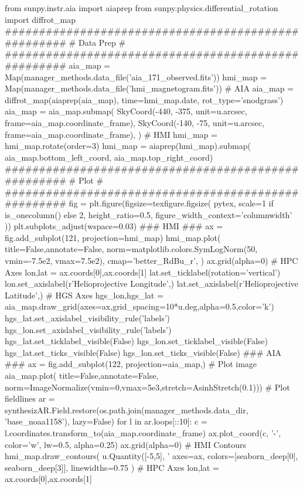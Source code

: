 \begin{pycode}
from sunpy.instr.aia import aiaprep
from sunpy.physics.differential_rotation import diffrot_map
####################################################
#                     Data Prep                    #
####################################################
aia_map = Map(manager_methods.data_file('aia_171_observed.fits'))
hmi_map = Map(manager_methods.data_file('hmi_magnetogram.fits'))
# AIA
aia_map = diffrot_map(aiaprep(aia_map), time=hmi_map.date, rot_type='snodgrass')
aia_map = aia_map.submap(
    SkyCoord(-440, -375, unit=u.arcsec, frame=aia_map.coordinate_frame),
    SkyCoord(-140, -75, unit=u.arcsec, frame=aia_map.coordinate_frame),
)
# HMI
hmi_map = hmi_map.rotate(order=3)
hmi_map = aiaprep(hmi_map).submap(
    aia_map.bottom_left_coord, aia_map.top_right_coord)
####################################################
#                       Plot                       #
####################################################
fig = plt.figure(figsize=texfigure.figsize(
    pytex,
    scale=1 if is_onecolumn() else 2,
    height_ratio=0.5,       
    figure_width_context='columnwidth'
))
plt.subplots_adjust(wspace=0.03)
### HMI ###
ax = fig.add_subplot(121, projection=hmi_map)
hmi_map.plot(
    title=False,annotate=False,
    norm=matplotlib.colors.SymLogNorm(50, vmin=-7.5e2, vmax=7.5e2),
    cmap='better_RdBu_r',
)
ax.grid(alpha=0)
# HPC Axes
lon,lat = ax.coords[0],ax.coords[1]
lat.set_ticklabel(rotation='vertical')
lon.set_axislabel(r'Helioprojective Longitude',)
lat.set_axislabel(r'Helioprojective Latitude',)
# HGS Axes
hgs_lon,hgs_lat = aia_map.draw_grid(axes=ax,grid_spacing=10*u.deg,alpha=0.5,color='k')
hgs_lat.set_axislabel_visibility_rule('labels')
hgs_lon.set_axislabel_visibility_rule('labels')
hgs_lat.set_ticklabel_visible(False)
hgs_lon.set_ticklabel_visible(False)
hgs_lat.set_ticks_visible(False)
hgs_lon.set_ticks_visible(False)
### AIA ###
ax = fig.add_subplot(122, projection=aia_map,)
# Plot image
aia_map.plot(
    title=False,annotate=False,
    norm=ImageNormalize(vmin=0,vmax=5e3,stretch=AsinhStretch(0.1)))
# Plot fieldlines
ar = synthesizAR.Field.restore(os.path.join(manager_methods.data_dir, 'base_noaa1158'), lazy=False)
for l in ar.loops[::10]:
    c = l.coordinates.transform_to(aia_map.coordinate_frame)
    ax.plot_coord(c, '-', color='w', lw=0.5, alpha=0.25)
ax.grid(alpha=0)
# HMI Contours
hmi_map.draw_contours(
    u.Quantity([-5,5], '%
    axes=ax,
    colors=[seaborn_deep[0], seaborn_deep[3]],
    linewidths=0.75
)
# HPC Axes
lon,lat = ax.coords[0],ax.coords[1]

\end{pycode}
